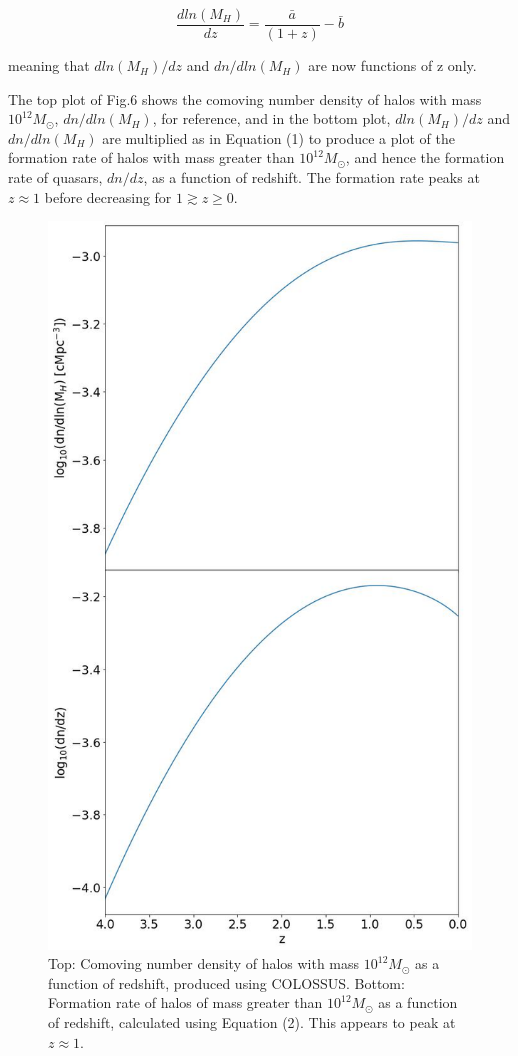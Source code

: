 \documentclass[12pt, twocolumn]{report}%
\begin{document}
\begin{equation}
    \frac{dln(M_H)}{dz}=\frac{\bar a}{(1+z)}-\bar b
\end{equation}

\noindent meaning that $dln(M_H)/dz$ and $dn/dln(M_H)$ are now functions of z only.\par

The top plot of Fig.6 shows the comoving number density of halos with mass $10^{12}M_\odot$, $dn/dln(M_H)$, for reference, and in the bottom plot, $dln(M_H)/dz$ and $dn/dln(M_H)$ are multiplied as in Equation (1) to produce a plot of the formation rate of halos with mass greater than $10^{12}M_\odot$, and hence the formation rate of quasars, $dn/dz$, as a function of redshift. The formation rate peaks at $z\approx1$ before decreasing for $1 \gtrsim z \geq 0$.

\onecolumngrid


\begin{figure}[H]
\centering
\includegraphics[width=12.5cm]{Plot_6.jpeg}
\caption{Top: Comoving number density of halos with mass $10^{12}M_\odot$ as a function of redshift, produced using COLOSSUS. Bottom: Formation rate of halos of mass greater than $10^{12}M_\odot$ as a function of redshift, calculated using Equation (2). This appears to peak at $z\approx1$.}
\label{fig:6}
\end{figure}
\newpage
\twocolumngrid
\end{document}
